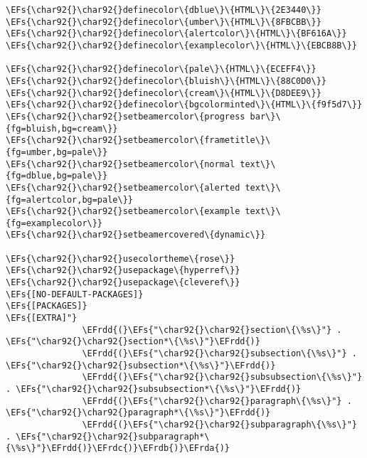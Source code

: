 \documentclass[c]{article}
\theoremstyle{plain}%
\theoremstyle{definition}
\theoremstyle{remark}
\newcommand{\EFs}[1]{\textcolor{EFs}{#1}} %
\newcommand{\EFrda}[1]{\textcolor{EFrda}{#1}} %
\newcommand{\EFrdb}[1]{\textcolor{EFrdb}{#1}} %
\newcommand{\EFrdc}[1]{\textcolor{EFrdc}{#1}} %
\newcommand{\EFrdd}[1]{\textcolor{EFrdd}{#1}} %
\begin{document}
\begin{Code}
\begin{Verbatim}
\EFs{\char92{}\char92{}definecolor\{dblue\}\{HTML\}\{2E3440\}}
\EFs{\char92{}\char92{}definecolor\{umber\}\{HTML\}\{8FBCBB\}}
\EFs{\char92{}\char92{}definecolor\{alertcolor\}\{HTML\}\{BF616A\}}
\EFs{\char92{}\char92{}definecolor\{examplecolor\}\{HTML\}\{EBCB8B\}}

\EFs{\char92{}\char92{}definecolor\{pale\}\{HTML\}\{ECEFF4\}}
\EFs{\char92{}\char92{}definecolor\{bluish\}\{HTML\}\{88C0D0\}}
\EFs{\char92{}\char92{}definecolor\{cream\}\{HTML\}\{D8DEE9\}}
\EFs{\char92{}\char92{}definecolor\{bgcolorminted\}\{HTML\}\{f9f5d7\}}
\EFs{\char92{}\char92{}setbeamercolor\{progress bar\}\{fg=bluish,bg=cream\}}
\EFs{\char92{}\char92{}setbeamercolor\{frametitle\}\{fg=umber,bg=pale\}}
\EFs{\char92{}\char92{}setbeamercolor\{normal text\}\{fg=dblue,bg=pale\}}
\EFs{\char92{}\char92{}setbeamercolor\{alerted text\}\{fg=alertcolor,bg=pale\}}
\EFs{\char92{}\char92{}setbeamercolor\{example text\}\{fg=examplecolor\}}
\EFs{\char92{}\char92{}setbeamercovered\{dynamic\}}

\EFs{\char92{}\char92{}usecolortheme\{rose\}}
\EFs{\char92{}\char92{}usepackage\{hyperref\}}
\EFs{\char92{}\char92{}usepackage\{cleveref\}}
\EFs{[NO-DEFAULT-PACKAGES]}
\EFs{[PACKAGES]}
\EFs{[EXTRA]"}
               \EFrdd{(}\EFs{"\char92{}\char92{}section\{\%s\}"} . \EFs{"\char92{}\char92{}section*\{\%s\}"}\EFrdd{)}
               \EFrdd{(}\EFs{"\char92{}\char92{}subsection\{\%s\}"} . \EFs{"\char92{}\char92{}subsection*\{\%s\}"}\EFrdd{)}
               \EFrdd{(}\EFs{"\char92{}\char92{}subsubsection\{\%s\}"} . \EFs{"\char92{}\char92{}subsubsection*\{\%s\}"}\EFrdd{)}
               \EFrdd{(}\EFs{"\char92{}\char92{}paragraph\{\%s\}"} . \EFs{"\char92{}\char92{}paragraph*\{\%s\}"}\EFrdd{)}
               \EFrdd{(}\EFs{"\char92{}\char92{}subparagraph\{\%s\}"} . \EFs{"\char92{}\char92{}subparagraph*\{\%s\}"}\EFrdd{)}\EFrdc{)}\EFrdb{)}\EFrda{)}
\end{Verbatim}
\end{Code}
\end{document}
